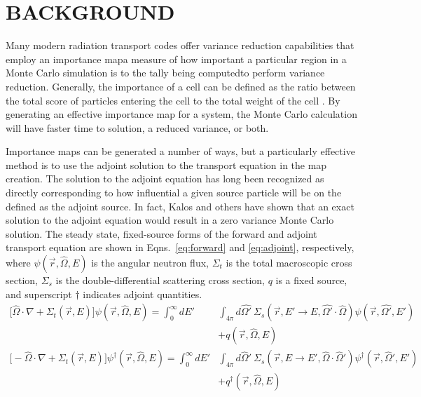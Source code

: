 \documentclass[12pt]{article}
\newcommand{\Macro}{\ensuremath{\Sigma}}
\newcommand{\vOmega}{\ensuremath{\hat{\Omega}}}
\newcommand{\rvec}{\ensuremath{\vec{r}}}
\begin{document}
%
\section{BACKGROUND}
\label{sect::second}

Many modern radiation transport codes offer variance reduction capabilities that employ an importance map\textemdash a measure of how important a particular region in a Monte Carlo simulation is to the tally being computed\textemdash to perform variance reduction. Generally, the importance of a cell can be defined as the ratio between the total score of particles entering the cell to the total weight of the cell \cite{booth_automatic_1982}. By generating an effective importance map for a system, the Monte Carlo calculation will have faster time to solution, a reduced variance, or both. 

Importance maps can be generated a number of ways, but a particularly effective method is to use the adjoint solution to the transport equation in the map creation. 
The solution to the adjoint equation has long been recognized as 
directly corresponding to how influential a given source particle will be on the defined as the adjoint source.
In fact, Kalos \cite{kalos_importance_1963, goertzel_monte_1958} and others have shown that an exact solution to the adjoint equation would result in a zero variance Monte Carlo solution. 
%
The steady state, fixed-source forms of the forward and adjoint transport equation are shown in Eqns.~\ref{eq:forward} and \ref{eq:adjoint}, respectively, where $\psi(\vec{r}, \hat{\Omega}, E)$ is the angular neutron flux, $\Sigma_t$ is the total macroscopic cross section, $\Sigma_s$ is the double-differential scattering cross section, $q$ is a fixed source, and superscript $\dagger$ indicates adjoint quantities.
%
\begin{align}
\bigl[\hat{\Omega} \cdot \nabla + \Macro_t(\vec{r}, E)\bigr] \psi(\vec{r}, \hat{\Omega}, E)  =  \int_0^{\infty} dE' &\int_{4\pi} d\hat{\Omega'} \:\Macro_{s}(\vec{r}, E' \to E, \hat{\Omega'} \cdot \hat{\Omega}) \psi(\vec{r}, \hat{\Omega'}, E')\nonumber \\
 &+ q(\vec{r}, \vOmega, E) \label{eq:forward} \\
%
\bigl[-\vOmega \cdot \nabla + \Sigma_t(\rvec, E)\bigr] \psi^{\dagger}(\vec{r}, \vOmega, E) = \int_0^{\infty} dE' &\int_{4\pi} d\vOmega' \: \Sigma_s(\rvec, E \rightarrow E', \vOmega \cdot \vOmega') \psi^{\dagger}(\rvec, \vOmega', E') \nonumber \\
&+ q^{\dagger}(\vec{r}, \vOmega, E) \label{eq:adjoint}
\end{align}
\end{document}
